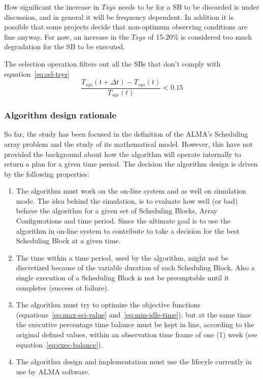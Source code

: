 \begin{description}
How significant the increase in $Tsys$ needs to be for a SB to be discarded
is under discussion, and in general it will be frequency dependent. In addition
it is possible that some projects decide that non-optimum observing conditions are
fine anyway. For now, an increase in the $Tsys$  of 15-20\% is considered too much
degradation for the SB to be executed.

The selection operation filters out all the SBs that don't comply with equation~\ref{eq:sel-tsys}
\begin{equation}
\label{eq:sel-tsys}
\frac{T_{sys}(t+\Delta t) - T_{sys}(t)}{T_{sys}(t)} < 0.15
\end{equation}

\end{description}

\subsubsection{Algorithm design rationale}

So far, the study has been focused in the definition of the ALMA's Scheduling array problem and the study of its mathematical model. However, this have not provided the background about how the algorithm will operate internally to return a plan for a given time period. The decision the algorithm design is driven by the following properties:
\begin{enumerate}
\item The algorithm must work on the on-line system and as well on simulation mode. The idea behind the simulation, is to evaluate how well (or bad) behave the algorithm for a given set of Scheduling Blocks, Array Configurations and time period. Since the ultimate goal is to use the algorithm in on-line system to contribute to take a decision for the best Scheduling Block at a given time.

\item The time within a time period, used by the algorithm, might not be discretized because of the variable duration of each Scheduling Block. Also a single execution of a Scheduling Block is not be preemptable until it completes (success ot failure). 

\item The algorithm must try to optimize the objective functions (equations~\ref{eq:max-sci-value} and~\ref{eq:min-idle-time}), but at the same time the executive percentage time balance must be kept in line, according to the original defined values, within an observation time frame of one (1) week (see equation~\ref{eq:exec-balance}).

\item The algorithm design and implementation must use the lifecyle currently in use by ALMA software.

\end{enumerate}

